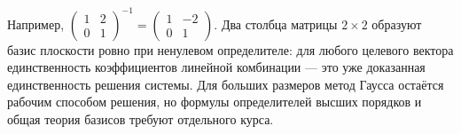 \ifdim\dimexpr\ht\CatFlowBox+\dp\CatFlowBox\relax<64mm\dp\CatFlowBox=\dimexpr64mm-\ht\CatFlowBox\relax\fi%
\noindent\usebox{\CatFlowBox}\par\addvspace{5pt}

Например, \(\begin{pmatrix}1&2\\0&1\end{pmatrix}^{-1}=\begin{pmatrix}1&-2\\0&1\end{pmatrix}\). Два столбца матрицы \(2\times2\) образуют базис плоскости ровно при ненулевом определителе: для любого целевого вектора единственность коэффициентов линейной комбинации — это уже доказанная единственность решения системы. Для больших размеров метод Гаусса остаётся рабочим способом решения, но формулы определителей высших порядков и общая теория базисов требуют отдельного курса.

